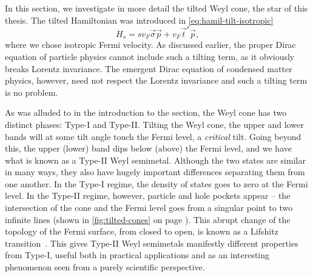 In this section, we investigate in more detail the tilted Weyl cone, the star of this thesis.
The tilted Hamiltonian was introduced in \cref{eq:hamil-tilt-isotropic}
\[
H_s = s v_F \vec{\sigma} \vec{p} + v_F \vec{t}^{s} \vec{p},
\]
where we chose isotropic Fermi velocity.
As discussed earlier, the proper Dirac equation of particle physics cannot include such a tilting term, as it obviously breaks Lorentz invariance.
The emergent Dirac equation of condensed matter physics, however, need not respect the Lorentz invariance and such a tilting term is no problem.

As was alluded to in the introduction to the section, the Weyl cone has two distinct phases: Type-I and
Type-II.
Tilting the Weyl cone, the upper and lower bands will at some tilt angle touch the Fermi level, a \emph{critical} tilt.
Going beyond this, the upper (lower) band dips below (above) the Fermi level, and we have what is known as a Type-II Weyl semimetal.
Although the two states are similar in many ways, they also have hugely important differences separating them from one another.
In the Type-I regime, the density of states goes to zero at the Fermi level.
In the Type-II regime, however, particle and hole pockets appear -- the intersection of the cone and the Fermi level goes from a singular point to two infinite lines (shown in \cref{fig:tilted-cones} on page \pageref{fig:tilted-cones}).
This abrupt change of the topology of the Fermi surface, from closed to open, is known as a Lifshitz transition~\cite{volovikTopologicalLifshitzTransitions2017}.
This gives Type-II Weyl semimetals manifestly different properties from Type-I, useful both in practical applications and as an interesting phenomenon seen from a purely scientific perspective.



